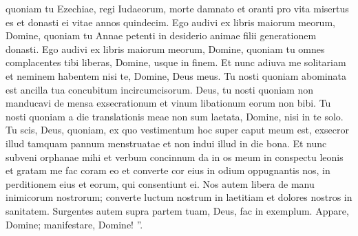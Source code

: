 \begin{biblechapter}
\begin{biblechapter}
\begin{biblechapter}
\begin{biblechapter}
 quoniam tu Ezechiae, regi Iudaeorum,
 morte damnato et oranti pro vita misertus es
 et donasti ei vitae annos quindecim. 
\versez Ego audivi ex libris maiorum meorum, Domine,
 quoniam tu Annae petenti in desiderio animae
 filii generationem donasti.
 \verseaa Ego audivi ex libris maiorum meorum, Domine,
 quoniam tu omnes complacentes tibi liberas, Domine,
 usque in finem.
 \versebb Et nunc adiuva me solitariam
 et neminem habentem nisi te,
 Domine, Deus meus.
 \versecc Tu nosti
 quoniam abominata est ancilla tua concubitum incircumcisorum.
 \versedd Deus, tu nosti
 quoniam non manducavi de mensa exsecrationum
 et vinum libationum eorum non bibi.
 \verseee Tu nosti
 quoniam a die translationis meae
 non sum laetata, Domine,
 nisi in te solo.
 \verseff Tu scis, Deus,
 quoniam, ex quo vestimentum hoc super caput meum est,
 exsecror illud tamquam pannum menstruatae
 et non indui illud in die bona.
 \versegg Et nunc subveni orphanae mihi
 et verbum concinnum da in os meum in conspectu leonis
 et gratam me fac coram eo
 et converte cor eius in odium oppugnantis nos,
 in perditionem eius et eorum, qui consentiunt ei.
 \versehh Nos autem libera de manu inimicorum nostrorum;
 converte luctum nostrum in laetitiam
 et dolores nostros in sanitatem.
 \verseii Surgentes autem supra partem tuam, Deus,
 fac in exemplum.
 \versekk Appare, Domine; manifestare, Domine! ”.
 

\end{biblechapter}
\end{biblechapter}
\end{biblechapter}
\end{biblechapter}
